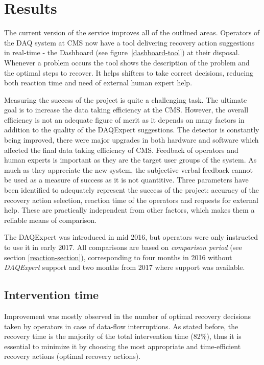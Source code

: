 \documentclass[a4paper]{jpconf}
\begin{document}
\section{Results}

The current version of the service improves all of the outlined areas. Operators of the DAQ system at CMS now have a tool delivering recovery action suggestions in real-time - the Dashboard (see figure~\ref{dashboard-tool}) at their disposal. Whenever a problem occurs the tool shows the description of the problem and the optimal steps to recover. It helps shifters to take correct decisions, reducing both reaction time and need of external human expert help.

Measuring the success of the project is quite a challenging task. The ultimate goal is to increase the data taking efficiency at the CMS. However, the overall efficiency is not an adequate figure of merit as it depends on many factors in addition to the quality of the DAQExpert suggestions. The detector is constantly being improved, there were major upgrades in both hardware and software which affected the final data taking efficiency of CMS. Feedback of operators and human experts is important as they are the target user groups of the system. As much as they appreciate the new system, the subjective verbal feedback cannot be used as a measure of success as it is not quantitive. Three parameters have been identified to adequately represent the success of the project: accuracy of the recovery action selection, reaction time of the operators and requests for external help. These are practically independent from other factors, which makes them a reliable means of comparison.

The DAQExpert was introduced in mid 2016, but operators were only instructed to use it in early 2017. All comparisons are based on {\it comparison period} (see section \ref{reaction-section}), corresponding to four months in 2016 without {\it DAQExpert} support and two months from 2017 where support was available. 


\subsection{Intervention time}

Improvement was mostly observed in the number of optimal recovery decisions taken by operators in case of data-flow interruptions. As stated before, the recovery time is the majority of the total intervention time (82\%), thus it is essential to minimize it by choosing the most appropriate and time-efficient recovery actions (optimal recovery actions). 
\end{document}
